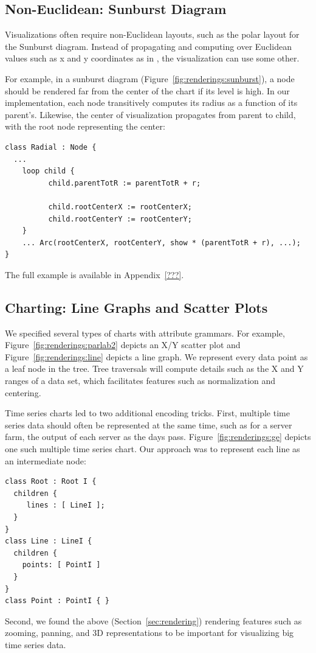 \subsection{Non-Euclidean: Sunburst Diagram}
Visualizations often require non-Euclidean layouts, such as the polar layout for the Sunburst diagram. Instead of propagating and computing over Euclidean values such as x and y coordinates as in \hlang, the visualization can use some other.

For example, in a sunburst diagram (Figure~\ref{fig:renderings:sunburst}), a node should be rendered  far from the center of the chart if its level is high. In our implementation, each node transitively computes its  radius as a function of its parent's. Likewise, the center of visualization propagates from parent to child, with the root node representing the center:

\begin{minipage}{0.8\columnwidth}
\begin{lstlisting}
class Radial : Node {
  ...
	loop child {
	      child.parentTotR := parentTotR + r;
	  
	      child.rootCenterX := rootCenterX;
	      child.rootCenterY := rootCenterY;
	}
	... Arc(rootCenterX, rootCenterY, show * (parentTotR + r), ...);
}
\end{lstlisting}
\end{minipage}

The full example is available in Appendix~\ref{???}.


\subsection{Charting: Line Graphs and Scatter Plots}
We specified several types of charts with attribute grammars. For example, Figure~\ref{fig:renderings:parlab2} depicts an X/Y scatter plot and Figure~\ref{fig:renderings:line} depicts a line graph. We represent every data point as a leaf node in the tree. Tree traversals will compute details such as the X and Y ranges of a data set, which facilitates features such as normalization and centering.

Time series charts led to two additional encoding tricks. First, multiple time series data should often be represented at the same time, such as for a server farm, the output of each server as the days pass. Figure~\ref{fig:renderings:ge} depicts one such multiple time series chart. Our approach was to represent each line as an intermediate node:
\begin{lstlisting}
class Root : Root I {
  children {
     lines : [ LineI ];
  }
}
class Line : LineI {
  children {
    points: [ PointI ]
  }
}
class Point : PointI { }
\end{lstlisting}
Second, we found the above (Section~\ref{sec:rendering}) rendering features such as zooming, panning, and 3D representations to be important for visualizing big time series data.


